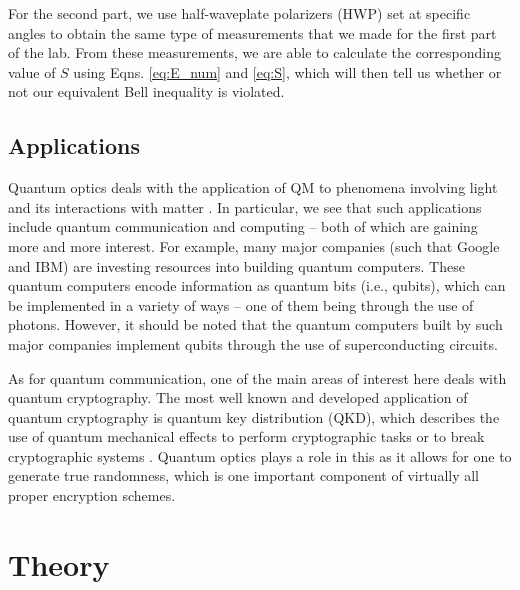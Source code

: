 \documentclass[twocolumn,amsmath,amssymb,pra]{revtex4-2}
\begin{document}
For the second part, we use half-waveplate polarizers (HWP) set at specific angles to obtain the same type of measurements that we made for the first part of the lab. From these measurements, we are able to calculate the corresponding value of $S$ using Eqns. \ref{eq:E_num} and \ref{eq:S}, which will then tell us whether or not our equivalent Bell inequality is violated.

\subsection{Applications}
Quantum optics deals with the application of QM to phenomena involving light and its interactions with matter \cite{picoquant}. In particular, we see that such applications include quantum communication and computing -- both of which are gaining more and more interest. For example, many major companies (such that Google and IBM) are investing resources into building quantum computers. These quantum computers encode information as quantum bits (i.e., qubits), which can be implemented in a variety of ways -- one of them being through the use of photons. However, it should be noted that the quantum computers built by such major companies implement qubits through the use of superconducting circuits.

As for quantum communication, one of the main areas of interest here deals with quantum cryptography. The most well known and developed application of quantum cryptography is quantum key distribution (QKD), which describes the use of quantum mechanical effects to perform cryptographic tasks or to break cryptographic systems \cite{picoquant}. Quantum optics plays a role in this as it allows for one to generate true randomness, which is one important component of virtually all proper encryption schemes.

\section{Theory}
\end{document}
